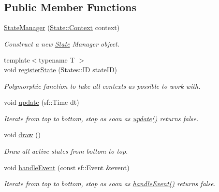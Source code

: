 \subsection*{Public Member Functions}
\begin{DoxyCompactItemize}
\item 
\hyperlink{classStateManager_a4fbfb54fde50aefb32f8fd1cfe234c76}{State\+Manager} (\hyperlink{structState_1_1Context}{State\+::\+Context} context)
\begin{DoxyCompactList}\small\item\em Construct a new \hyperlink{classState}{State} Manager object. \end{DoxyCompactList}\item 
{\footnotesize template$<$typename T $>$ }\\void \hyperlink{classStateManager_a82f1a73f868174c930eb3d254b4eb7bb}{register\+State} (States\+::\+ID state\+ID)
\begin{DoxyCompactList}\small\item\em Polymorphic function to take all contexts as possible to work with. \end{DoxyCompactList}\item 
void \hyperlink{classStateManager_a07b3a4d61e0f75fc6c8730f9f77449a4}{update} (sf\+::\+Time dt)
\begin{DoxyCompactList}\small\item\em Iterate from top to bottom, stop as soon as \hyperlink{classStateManager_a07b3a4d61e0f75fc6c8730f9f77449a4}{update()} returns false. \end{DoxyCompactList}\item 
\mbox{\label{classStateManager_a22666f2f72320ea3be46e9253b7530e2}} 
void \hyperlink{classStateManager_a22666f2f72320ea3be46e9253b7530e2}{draw} ()
\begin{DoxyCompactList}\small\item\em Draw all active states from bottom to top. \end{DoxyCompactList}\item 
void \hyperlink{classStateManager_abe6bc824c376c7c5ec22b18b10b3ad92}{handle\+Event} (const sf\+::\+Event \&event)
\begin{DoxyCompactList}\small\item\em Iterate from top to bottom, stop as soon as \hyperlink{classStateManager_abe6bc824c376c7c5ec22b18b10b3ad92}{handle\+Event()} returns false. \end{DoxyCompactList}\item 

\end{DoxyCompactItemize}
